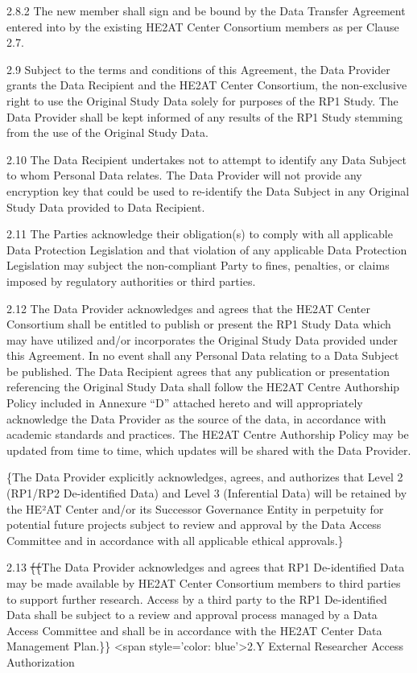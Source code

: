 \documentclass[12pt,letterpaper]{article}
\newcommand{\deleted}[1]{\textcolor{deletecolor}{\sout{#1}}}
\newcommand{\added}[1]{\textcolor{addcolor}{#1}}
\begin{document}
2.8.2	The new member shall sign and be bound by the Data Transfer Agreement entered into by the existing HE2AT Center Consortium members as per Clause 2.7.

2.9	Subject to the terms and conditions of this Agreement, the Data Provider grants the Data Recipient and the HE2AT Center Consortium, the non-exclusive right to use the Original Study Data solely for purposes of the RP1 Study. The Data Provider shall be kept informed of any results of the RP1 Study stemming from the use of the Original Study Data.

2.10	The Data Recipient undertakes not to attempt to identify any Data Subject to whom Personal Data relates. The Data Provider will not provide any encryption key that could be used to re-identify the Data Subject in any Original Study Data provided to Data Recipient.

2.11	The Parties acknowledge their obligation(s) to comply with all applicable Data Protection Legislation and that violation of any applicable Data Protection Legislation may subject the non-compliant Party to fines, penalties, or claims imposed by regulatory authorities or third parties. 

2.12   The Data Provider acknowledges and agrees that the HE2AT Center Consortium shall be entitled to publish or present the RP1 Study Data which may have utilized and/or incorporates the Original Study Data provided under this Agreement. In no event shall any Personal Data relating to a Data Subject be published. The Data Recipient agrees that any publication or presentation referencing the Original Study Data shall follow the HE2AT Centre Authorship Policy included in Annexure “D” attached hereto and will appropriately acknowledge the Data Provider as the source of the data, in accordance with academic standards and practices. The HE2AT Centre Authorship Policy may be updated from time to time, which updates will be shared with the Data Provider.

\added\{The Data Provider explicitly acknowledges, agrees, and authorizes that Level 2 (RP1/RP2 De-identified Data) and Level 3 (Inferential Data) will be retained by the HE²AT Center and/or its Successor Governance Entity in perpetuity for potential future projects subject to review and approval by the Data Access Committee and in accordance with all applicable ethical approvals.\}

2.13	\deleted\{\deleted\{The Data Provider acknowledges and agrees that RP1 De-identified Data may be made available by HE2AT Center Consortium members to third parties to support further research. Access by a third party to the RP1 De-identified Data shall be subject to a review and approval process managed by a Data Access Committee and shall be in accordance with the HE2AT Center Data Management Plan.\}\} <span style='color: blue'>2.Y External Researcher Access Authorization
\end{document}
